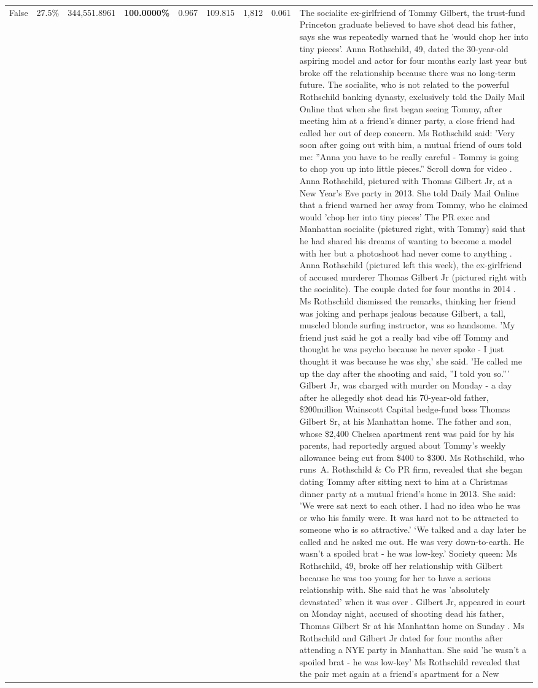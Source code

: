\begin{table}[H]
\begin{tabular}{lllrlllll}
False & 27.5\% & 344,551.8961 & \bfseries \color{red} 100.0000\% & 0.967 & 109.815 & 1,812 & 0.061 & The socialite ex-girlfriend of Tommy Gilbert, the trust-fund Princeton graduate believed to have shot dead his father, says she was repeatedly warned that he 'would chop her into tiny pieces'. Anna Rothschild, 49, dated the 30-year-old aspiring model and actor for four months early last year but broke off the relationship because there was no long-term future. The socialite, who is not related to the powerful Rothschild banking dynasty, exclusively told the Daily Mail Online that when she first began seeing Tommy, after meeting him at a friend's dinner party, a close friend had called her out of deep concern. Ms Rothschild said: 'Very soon after going out with him, a mutual friend of ours told me: ''Anna you have to be really careful - Tommy is going to chop you up into little pieces.'' Scroll down for video . Anna Rothschild, pictured with Thomas Gilbert Jr, at a New Year's Eve party in 2013. She told Daily Mail Online that a friend warned her away from Tommy, who he claimed would 'chop her into tiny pieces' The PR exec and Manhattan socialite (pictured right, with Tommy) said that he had shared his dreams of wanting to become a model with her but a photoshoot had never come to anything . Anna Rothschild (pictured left this week), the ex-girlfriend of accused murderer Thomas Gilbert Jr (pictured right with the socialite). The couple dated for four months in 2014 . Ms Rothschild dismissed the remarks, thinking her friend was joking and perhaps jealous because Gilbert, a tall, muscled blonde surfing instructor, was so handsome. 'My friend just said he got a really bad vibe off Tommy and thought he was psycho because he never spoke - I just thought it was because he was shy,' she said. 'He called me up the day after the shooting and said, ''I told you so.''' Gilbert Jr, was charged with murder on Monday - a day after he allegedly shot dead his 70-year-old father, \$200million Wainscott Capital hedge-fund boss Thomas Gilbert Sr, at his Manhattan home. The father and son, whose \$2,400 Chelsea apartment rent was paid for by his parents, had reportedly argued about Tommy's weekly allowance being cut from \$400 to \$300. Ms Rothschild, who runs A. Rothschild \& Co PR firm, revealed that she began dating Tommy after sitting next to him at a Christmas dinner party at a mutual friend's home in 2013. She said: 'We were sat next to each other. I had no idea who he was or who his family were. It was hard not to be attracted to someone who is so attractive.' ‘We talked and a day later he called and he asked me out. He was very down-to-earth. He wasn’t a spoiled brat - he was low-key.’ Society queen: Ms Rothschild, 49, broke off her relationship with Gilbert because he was too young for her to have a serious relationship with. She said that he was 'absolutely devastated' when it was over . Gilbert Jr, appeared in court on Monday night, accused of shooting dead his father, Thomas Gilbert Sr at his Manhattan home on Sunday . Ms Rothschild and Gilbert Jr dated for four months after attending a NYE party in Manhattan. She said 'he wasn't a spoiled brat - he was low-key' Ms Rothschild revealed that the pair met again at a friend’s apartment for a New 
\end{tabular}
\end{table}
